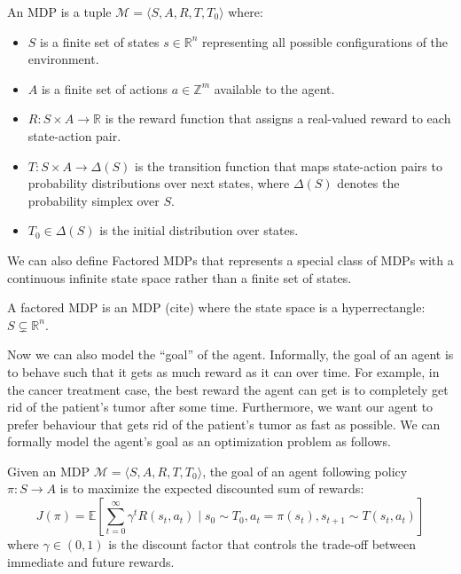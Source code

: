 \begin{definition} An MDP is a tuple $\mathcal{M} = \langle S, A, R, T, T_0 \rangle$ where:
\begin{itemize}
\item $S$ is a finite set of states $s \in \mathbb{R}^n$ representing all possible configurations of the environment.
\item $A$ is a finite set of actions $a \in \mathbb{Z}^m$ available to the agent.
\item $R: S \times A \rightarrow \mathbb{R}$ is the reward function that assigns a real-valued reward to each state-action pair.
\item $T: S \times A \rightarrow \Delta(S)$ is the transition function that maps state-action pairs to probability distributions over next states, where $\Delta(S)$ denotes the probability simplex over $S$.
\item $T_0 \in \Delta(S)$ is the initial distribution over states.
\end{itemize}
\end{definition}
We can also define Factored MDPs that represents a special class of MDPs with a continuous infinite state space rather than a finite set of states.

\begin{definition} A factored MDP is an MDP (cite) where the state space is a hyperrectangle: $S\subsetneq \mathbb{R}^n$.
\end{definition}

Now we can also model the ``goal'' of the agent. Informally, the goal of an agent is to behave such that it gets as much reward as it can over time. For example, in the cancer treatment case, the best reward the agent can get is to completely get rid of the patient's tumor after some time. Furthermore, we want our agent to prefer behaviour that gets rid of the patient's tumor as fast as possible. We can formally model the agent's goal as an optimization problem as follows. %

\begin{definition} Given an MDP $\mathcal{M}=\langle S, A, R, T, T_0 \rangle$, the goal of an agent following policy $\pi: S \rightarrow A$ is to maximize the expected discounted sum of rewards:
$$J(\pi) = \mathbb{E}\left[\sum_{t=0}^{\infty} \gamma^t R(s_t, a_t) \mid s_0 \sim T_0, a_t = \pi(s_t), s_{t+1} \sim T(s_t, a_t)\right]$$
where $\gamma \in (0,1)$ is the discount factor that controls the trade-off between immediate and future rewards.
\end{definition}

